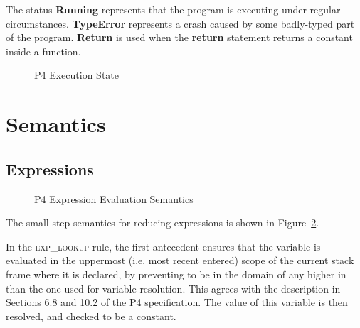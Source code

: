 \documentclass[UTF8]{article}
\begin{document}
The status \textbf{Running} represents that the program is executing under regular circumstances. \textbf{TypeError} represents a crash caused by some badly-typed part of the program. \textbf{Return} is used when the \textbf{return} statement returns a constant inside a function.

\begin{figure}[h!]
\centering\ottgrammartabular{
\ottstatus\ottinterrule
\ottstate\ottafterlastrule
}
\caption{P4 Execution State}
\label{fig:status}
\end{figure}

\section{Semantics}
\subsection{Expressions}

\begin{figure}[ht!]
\caption{P4 Expression Evaluation Semantics}
\label{fig:semexp}
\end{figure}

The small-step semantics for reducing expressions is shown in Figure~\ref{fig:semexp}.

In the \textsc{exp\_lookup} rule, the first antecedent ensures that the variable \str{} is evaluated in the uppermost (i.e. most recent entered) scope of the current stack frame \currsf{} where it is declared, by preventing \str{} to be in the domain of any \scope{} higher in \currsf{} than the one used for variable resolution. This agrees with the description in \href{https://p4.org/p4-spec/docs/P4-16-v1.2.1.html#sec-name-resolution}{Sections 6.8} and \href{https://p4.org/p4-spec/docs/P4-16-v1.2.1.html#sec-variables}{10.2} of the P4 specification. The value of this variable is then resolved, and checked to be a constant.
\end{document}
